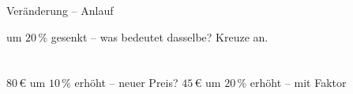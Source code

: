 \setcounter{aufgabe}{0}

\begin{aufgabe}{Veränderung – Anlauf}
\begin{teile}
\teil um $20\,\%$ gesenkt – was bedeutet dasselbe? Kreuze an.\\ \\ \\ 
\teil $80\,€$ um $10\,\%$ erhöht – neuer Preis? \leerfeld[€]
\teil $45\,€$ um $20\,\%$ erhöht – mit Faktor \leerfeld[€]
\end{teile}
\end{aufgabe}

